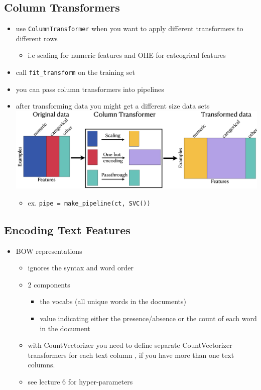 \documentclass[10.5pt,a4paper, fleqn, dvipsnames]{article}
\begin{document}
\subsection*{Column Transformers}
\begin{itemize}
    \item use \lstinline{ColumnTransformer} when you want to apply different transformers to different rows 
    \begin{itemize}
        \item i.e scaling for numeric features and OHE for cateogrical features
    \end{itemize}
    \item call \lstinline{fit_transform} on the training set
    \item you can pass column transformers into pipelines 
    \item after transforming data you might get a different size data sets\\
    \includegraphics[scale = 0.18]{column-transformer.png}
    \begin{itemize}
        \item ex. \lstinline{pipe = make_pipeline(ct, SVC())}
    \end{itemize}
\end{itemize}
\subsection*{Encoding Text Features}
\begin{itemize}
    \item BOW representations 
    \begin{itemize}
        \item ignores the syntax and word order
        \item 2 components
        \begin{itemize}[leftmargin = 2em]
            \item the vocabs (all unique words in the documents)
            \item value indicating either the presence/absence or the count of each word in the document 
        \end{itemize}
        \item with CountVectorizer you need to define separate CountVectorizer transformers for each text column , if you have more than one text columns.
        \item see lecture 6 for hyper-parameters
    \end{itemize}
\end{itemize}
\end{document}
